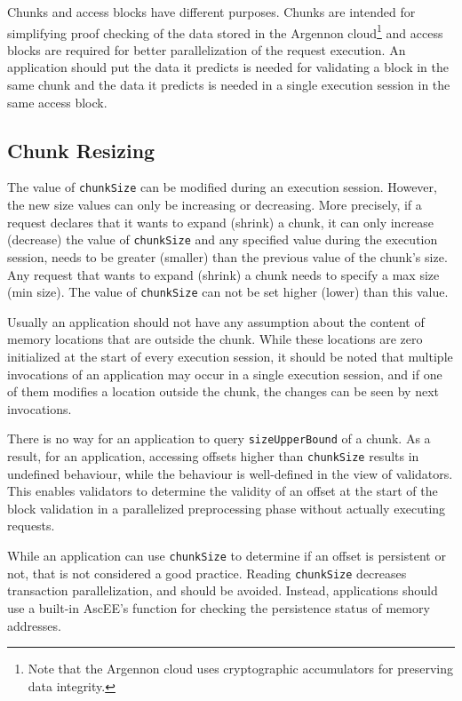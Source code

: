 Chunks and access blocks have different purposes. Chunks are intended for simplifying proof checking of the data
stored in the Argennon cloud\footnote{Note that
the Argennon cloud uses cryptographic accumulators for preserving data integrity.} and access blocks are
required for better parallelization of the request execution. An application should put the data it predicts is
needed for validating a block in the same chunk and the data it predicts is needed in a single execution
session in the same access block.

\subsection{Chunk Resizing}\label{subsec:ch-resize}


The value of \texttt{chunkSize} can be modified during an execution session. However, the new size values can only be
increasing or decreasing. More precisely, if a request declares that it wants to expand (shrink) a chunk, it can only
increase (decrease) the value of \texttt{chunkSize} and any specified value during the execution
session, needs to be greater (smaller) than the previous value of the chunk's size. Any request that wants to expand
(shrink) a chunk needs to specify a max size (min size). The value of \texttt{chunkSize} can not be set higher
(lower) than this value.

Usually an application should not have any assumption about the content of memory locations that are outside the chunk.
While these locations are zero initialized at the start of every execution session, it should be noted that multiple
invocations of an application may occur in a single execution session, and if one of them modifies a location outside
the chunk, the changes can be seen by next invocations.

There is no way for an application to query \texttt{sizeUpperBound} of a chunk. As a result, for an application,
accessing offsets higher than \texttt{chunkSize} results in undefined behaviour, while the behaviour is well-defined
in the view of validators.
This enables validators to determine the validity of an offset at the start of the block validation in a parallelized
preprocessing phase without actually executing requests.

While an application can use \texttt{chunkSize} to determine if an offset is persistent or not, that is not
considered a good practice. Reading \texttt{chunkSize} decreases transaction parallelization, and should be avoided.
Instead, applications should use a built-in AscEE's function for checking the persistence status of memory addresses.

